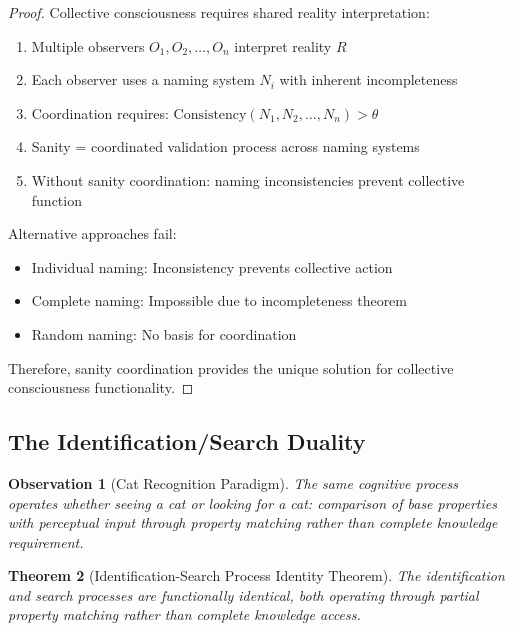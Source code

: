 \documentclass[12pt,a4paper]{article}
\newtheorem{theorem}{Theorem}[section]
\newtheorem{observation}[theorem]{Observation}
\begin{document}
\begin{proof}
Collective consciousness requires shared reality interpretation:
\begin{enumerate}
\item Multiple observers $O_1, O_2, \ldots, O_n$ interpret reality $R$
\item Each observer uses a naming system $N_i$ with inherent incompleteness
\item Coordination requires: $\text{Consistency}(N_1, N_2, \ldots, N_n) > \theta$
\item Sanity = coordinated validation process across naming systems
\item Without sanity coordination: naming inconsistencies prevent collective function
\end{enumerate}

Alternative approaches fail:
\begin{itemize}
\item Individual naming: Inconsistency prevents collective action
\item Complete naming: Impossible due to incompleteness theorem
\item Random naming: No basis for coordination
\end{itemize}

Therefore, sanity coordination provides the unique solution for collective consciousness functionality.
\end{proof}

\subsection{The Identification/Search Duality}

\begin{observation}[Cat Recognition Paradigm]
The same cognitive process operates whether seeing a cat or looking for a cat: comparison of base properties with perceptual input through property matching rather than complete knowledge requirement.
\end{observation}

\begin{theorem}[Identification-Search Process Identity Theorem]
The identification and search processes are functionally identical, both operating through partial property matching rather than complete knowledge access.
\end{theorem}
\end{document}
